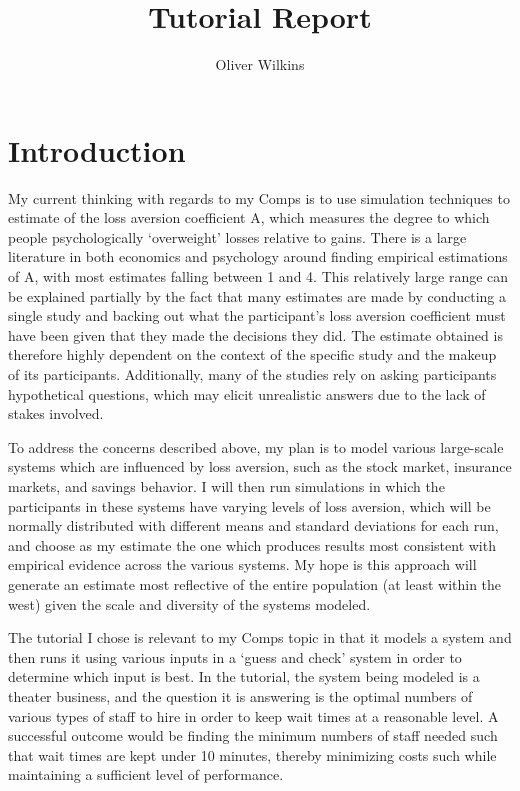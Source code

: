 \documentclass[10pt,twocolumn]{article}
\title{Tutorial Report}
\author{Oliver Wilkins}
\affiliation{Occidental College}
\begin{document}
\maketitle

\section{Introduction}

My current thinking with regards to my Comps is to use simulation techniques to estimate of the loss aversion coefficient A, which measures the degree to which people psychologically ‘overweight’ losses relative to gains. There is a large literature in both economics and psychology around finding empirical estimations of A, with most estimates falling between 1 and 4. This relatively large range can be explained partially by the fact that many estimates are made by conducting a single study and backing out what the participant’s loss aversion coefficient must have been given that they made the decisions they did. The estimate obtained is therefore highly dependent on the context of the specific study and the makeup of its participants. Additionally, many of the studies rely on asking participants hypothetical questions, which may elicit unrealistic answers due to the lack of stakes involved.

To address the concerns described above, my plan is to model various large-scale systems which are influenced by loss aversion, such as the stock market, insurance markets, and savings behavior. I will then run simulations in which the participants in these systems have varying levels of loss aversion, which will be normally distributed with different means and standard deviations for each run, and choose as my estimate the one which produces results most consistent with empirical evidence across the various systems. My hope is this approach will generate an estimate most reflective of the entire population (at least within the west) given the scale and diversity of the systems modeled.

The tutorial I chose is relevant to my Comps topic in that it models a system and then runs it using various inputs in a ‘guess and check’ system in order to determine which input is best. In the tutorial, the system being modeled is a theater business, and the question it is answering is the optimal numbers of various types of staff to hire in order to keep wait times at a reasonable level. A successful outcome would be finding the minimum numbers of staff needed such that wait times are kept under 10 minutes, thereby minimizing costs such while maintaining a sufficient level of performance.
\end{document}
